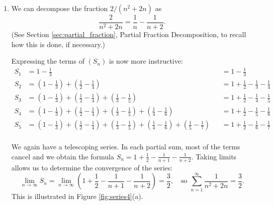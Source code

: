 \documentclass{ximera}
\begin{document}
{\begin{enumerate}
\item		We can decompose the fraction $2/(n^2+2n)$ as $$\frac2{n^2+2n} = \frac1n-\frac1{n+2}.$$ (See Section \ref{sec:partial_fraction}, Partial Fraction Decomposition, to recall how  this is done, if necessary.)

Expressing the terms of $(S_n)$ is now more instructive:
\footnotesize
\begin{align*}
S_1 &= 1-\frac13 &&= 1-\frac13\\
S_2 &= \left(1-\frac13\right) + \left(\frac12-\frac14\right) &&= 1+\frac12-\frac13-\frac14\\
S_3 &= \left(1-\frac13\right) + \left(\frac12-\frac14\right)+\left(\frac13-\frac15\right) &&= 1+\frac12-\frac14-\frac15\\
S_4 &= \left(1-\frac13\right) + \left(\frac12-\frac14\right)+\left(\frac13-\frac15\right)+\left(\frac14-\frac16\right) &&= 1+\frac12-\frac15-\frac16\\
S_5 &= \left(1-\frac13\right) + \left(\frac12-\frac14\right)+\left(\frac13-\frac15\right)+\left(\frac14-\frac16\right)+\left(\frac15-\frac17\right) &&= 1+\frac12-\frac16-\frac17\\
\end{align*}
\normalsize

We again have a telescoping series. In each partial sum, most of the terms cancel and we obtain the formula $S_n = 1+\frac12-\frac1{n+1}-\frac1{n+2}.$ Taking limits allows us to determine the convergence of the series:
$$\lim_{n\to\infty}S_n = \lim_{n\to\infty} \left(1+\frac12-\frac1{n+1}-\frac1{n+2}\right) = \frac32,\quad \text{so } \sum_{n=1}^\infty \frac1{n^2+2n} = \frac32.$$
This is illustrated in Figure \ref{fig:series4}(a).


\end{enumerate}}
\end{document}
